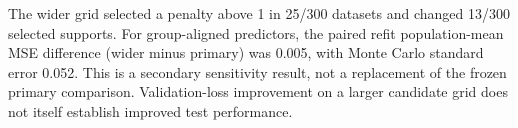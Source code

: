 The wider grid selected a penalty above 1 in 25/300 datasets and changed 13/300 selected supports. For group-aligned predictors, the paired refit population-mean MSE difference (wider minus primary) was 0.005, with Monte Carlo standard error 0.052. This is a secondary sensitivity result, not a replacement of the frozen primary comparison. Validation-loss improvement on a larger candidate grid does not itself establish improved test performance.
